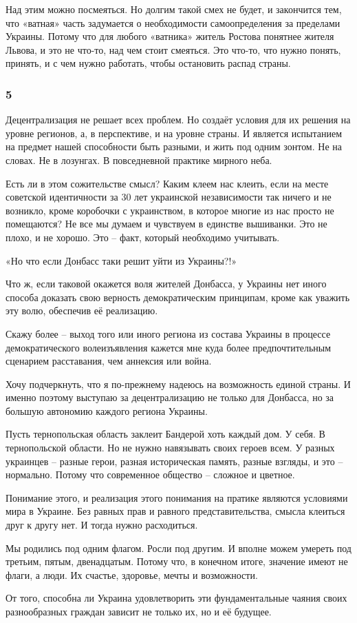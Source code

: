 Над этим можно посмеяться. Но долгим такой смех не будет, и закончится тем, что
«ватная» часть задумается о необходимости самоопределения за пределами Украины.
Потому что для любого «ватника» житель Ростова понятнее жителя Львова, и это не
что-то, над чем стоит смеяться. Это что-то, что нужно понять, принять, и с чем
нужно работать, чтобы остановить распад страны.

\subsubsection{5}

Децентрализация не решает всех проблем. Но создаёт условия для их решения на
уровне регионов, а, в перспективе, и на уровне страны. И является испытанием на
предмет нашей способности быть разными, и жить под одним зонтом. Не на словах.
Не в лозунгах. В повседневной практике мирного неба.

Есть ли в этом сожительстве смысл? Каким клеем нас клеить, если на месте
советской идентичности за 30 лет украинской независимости так ничего и не
возникло, кроме коробочки с украинством, в которое многие из нас просто не
помещаются? Не все мы думаем и чувствуем в единстве вышиванки. Это не плохо, и
не хорошо. Это – факт, который необходимо учитывать.

«Но что если Донбасс таки решит уйти из Украины?!» 

Что ж, если таковой окажется воля жителей Донбасса, у Украины нет иного способа
доказать свою верность демократическим принципам, кроме как уважить эту волю,
обеспечив её реализацию. 

Скажу более – выход того или иного региона из состава Украины в процессе
демократического волеизъявления кажется мне куда более предпочтительным
сценарием расставания, чем аннексия или война.

Хочу подчеркнуть, что я по-прежнему надеюсь на возможность единой страны. И
именно поэтому выступаю за децентрализацию не только для Донбасса, но за
большую автономию каждого региона Украины. 

Пусть тернопольская область заклеит Бандерой хоть каждый дом. У себя. В
тернопольской области. Но не нужно навязывать своих героев всем. У разных
украинцев – разные герои, разная историческая память, разные взгляды, и это –
нормально. Потому что современное общество – сложное и цветное. 

Понимание этого, и реализация этого понимания на пратике являются условиями
мира в Украине. Без равных прав и равного представительства, смысла клеиться
друг к другу нет. И тогда нужно расходиться. 

Мы родились под одним флагом. Росли под другим. И вполне можем умереть под
третьим, пятым, двенадцатым. Потому что, в конечном итоге, значение имеют не
флаги, а люди. Их счастье, здоровье, мечты и возможности.

От того, способна ли Украина удовлетворить эти фундаментальные чаяния своих
разнообразных граждан зависит не только их, но и её будущее. 

